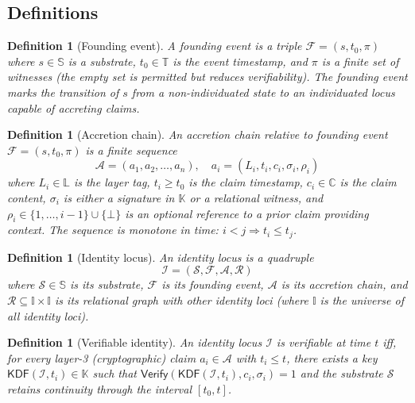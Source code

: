 \documentclass[11pt,a4paper,parskip=half-,DIV=12,headings=standardclasses]{scrartcl}
\theoremstyle{ncthm}
\theoremstyle{ncdef}
\newtheorem{definition}[theorem]{Definition}
\newcommand{\identity}{\mathcal{I}}
\newcommand{\substrate}{\mathcal{S}}
\newcommand{\founding}{\mathcal{F}}
\newcommand{\accretion}{\mathcal{A}}
\newcommand{\relations}{\mathcal{R}}
\newcommand{\KDF}{\mathsf{KDF}}
\newcommand{\Verify}{\mathsf{Verify}}
\begin{document}
\subsection{Definitions}

\begin{definition}[Founding event]\label{def:founding-event}
A \emph{founding event} is a triple
$\founding = (s, t_0, \pi)$
where $s \in \mathbb{S}$ is a substrate, $t_0 \in \mathbb{T}$ is the
event timestamp, and $\pi$ is a finite set of witnesses (the empty
set is permitted but reduces verifiability). The founding event marks
the transition of $s$ from a non-individuated state to an
individuated locus capable of accreting claims.
\end{definition}

\begin{definition}[Accretion chain]\label{def:accretion-chain}
An \emph{accretion chain} relative to founding event
$\founding = (s, t_0, \pi)$ is a finite sequence
\[
\accretion = (a_1, a_2, \ldots, a_n),
\quad
a_i = (L_i, t_i, c_i, \sigma_i, \rho_i)
\]
where $L_i \in \mathbb{L}$ is the layer tag, $t_i \geq t_0$ is the
claim timestamp, $c_i \in \mathbb{C}$ is the claim content,
$\sigma_i$ is either a signature in $\mathbb{K}$ or a relational
witness, and $\rho_i \in \{1,\ldots,i-1\} \cup \{\bot\}$ is an
optional reference to a prior claim providing context. The sequence
is monotone in time: $i < j \Rightarrow t_i \leq t_j$.
\end{definition}

\begin{definition}[Identity locus]\label{def:identity-locus}
An \emph{identity locus} is a quadruple
\[
\identity = (\substrate, \founding, \accretion, \relations)
\]
where $\substrate \in \mathbb{S}$ is its substrate,
$\founding$ is its founding event,
$\accretion$ is its accretion chain, and
$\relations \subseteq \mathbb{I} \times \mathbb{I}$ is its
relational graph with other identity loci
(where $\mathbb{I}$ is the universe of all identity loci).
\end{definition}

\begin{definition}[Verifiable identity]\label{def:verifiable-identity}
An identity locus $\identity$ is \emph{verifiable at time $t$} iff,
for every layer-3 (cryptographic) claim $a_i \in \accretion$ with
$t_i \leq t$, there exists a key $\KDF(\identity, t_i) \in \mathbb{K}$
such that $\Verify(\KDF(\identity, t_i), c_i, \sigma_i) = 1$ and the
substrate $\substrate$ retains continuity through the interval
$[t_0, t]$.
\end{definition}
\end{document}
